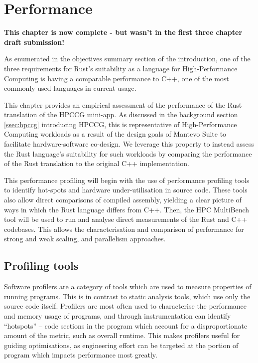 \chapter{Performance}
\label{ch:performance}

\textbf{This chapter is now complete - but wasn't in the first three chapter draft submission!}

As enumerated in the objectives summary section of the introduction, one of the three requirements for Rust's suitability as a language for High-Performance Computing is having a comparable performance to C++, one of the most commonly used languages in current usage.

This chapter provides an empirical assessment of the performance of the Rust translation of the HPCCG mini-app. As discussed in the background section \ref{ssec:hpccg} introducing HPCCG, this is representative of High-Performance Computing workloads as a result of the design goals of Mantevo Suite to facilitate hardware-software co-design. We leverage this property to instead assess the Rust language's suitability for such workloads by comparing the performance of the Rust translation to the original C++ implementation.

This performance profiling will begin with the use of performance profiling tools to identify hot-spots and hardware under-utilisation in source code. These tools also allow direct comparisons of compiled assembly, yielding a clear picture of ways in which the Rust language differs from C++. Then, the HPC MultiBench tool will be used to run and analyse direct measurements of the Rust and C++ codebases. This allows the characterisation and comparison of performance for strong and weak scaling, and parallelism approaches.

\section{Profiling tools}
\label{sec:profiling-tools}

Software profilers are a category of tools which are used to measure properties of running programs. This is in contrast to static analysis tools, which use only the source code itself. Profilers are most often used to characterise the performance and memory usage of programs, and through instrumentation can identify ``hotspots'' -- code sections in the program which account for a disproportionate amount of the metric, such as overall runtime. This makes profilers useful for guiding optimisations, as engineering effort can be targeted at the portion of program which impacts performance most greatly.

